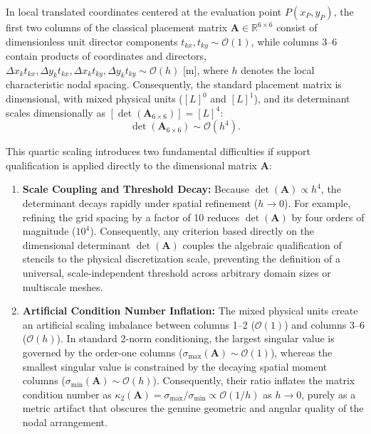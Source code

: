 \documentclass[preprint,12pt]{elsarticle}
\begin{document}
In local translated coordinates centered at the evaluation point $P(x_P, y_P)$, the first two columns of the classical placement matrix $\mathbf{A} \in \mathbb{R}^{6 \times 6}$ consist of dimensionless unit director components $t_{kx}, t_{ky} \sim \mathcal{O}(1)$, while columns 3--6 contain products of coordinates and directors, $\Delta x_k t_{kx}, \Delta y_k t_{kx}, \Delta x_k t_{ky}, \Delta y_k t_{ky} \sim \mathcal{O}(h)$ [m], where $h$ denotes the local characteristic nodal spacing. Consequently, the standard placement matrix is dimensional, with mixed physical units ($[L]^0$ and $[L]^1$), and its determinant scales dimensionally as $[\det(\mathbf{A}_{6\times6})] = [L]^4$:
\begin{equation}
    \det(\mathbf{A}_{6\times6}) \sim \mathcal{O}(h^4).
    \label{eq:det_quartic_scaling}
\end{equation}

This quartic scaling introduces two fundamental difficulties if support qualification is applied directly to the dimensional matrix $\mathbf{A}$:
\begin{enumerate}
    \item \textbf{Scale Coupling and Threshold Decay:} Because $\det(\mathbf{A}) \propto h^4$, the determinant decays rapidly under spatial refinement ($h \to 0$). For example, refining the grid spacing by a factor of 10 reduces $\det(\mathbf{A})$ by four orders of magnitude ($10^4$). Consequently, any criterion based directly on the dimensional determinant $\det(\mathbf{A})$ couples the algebraic qualification of stencils to the physical discretization scale, preventing the definition of a universal, scale-independent threshold across arbitrary domain sizes or multiscale meshes.
    \item \textbf{Artificial Condition Number Inflation:} The mixed physical units create an artificial scaling imbalance between columns 1--2 ($\mathcal{O}(1)$) and columns 3--6 ($\mathcal{O}(h)$). In standard 2-norm conditioning, the largest singular value is governed by the order-one columns ($\sigma_{\max}(\mathbf{A}) \sim \mathcal{O}(1)$), whereas the smallest singular value is constrained by the decaying spatial moment columns ($\sigma_{\min}(\mathbf{A}) \sim \mathcal{O}(h)$). Consequently, their ratio inflates the matrix condition number as $\kappa_2(\mathbf{A}) = \sigma_{\max} / \sigma_{\min} \propto \mathcal{O}(1/h)$ as $h \to 0$, purely as a metric artifact that obscures the genuine geometric and angular quality of the nodal arrangement.
\end{enumerate}
\end{document}
